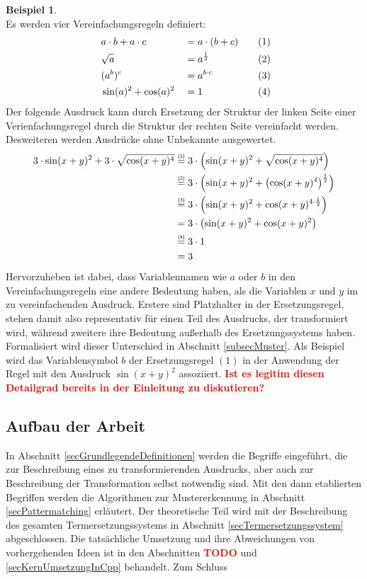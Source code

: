 \documentclass{scrartcl}
\numberwithin{figure}{section} %
\DeclarePairedDelimiter\paren{(}{)}
\theoremstyle{definition} %
\newcommand{\stapel}[2]{\mathrel{\overset{\makebox[0pt]{\mbox{\normalfont\tiny\sffamily {#2}}}}{#1}}}
\newcommand{\BFred}[1]{\textbf{\textcolor{red}{#1}}}
\begin{document}
\newtheorem{bsp}{Beispiel}[section]
\begin{bsp}~\\
Es werden vier Vereinfachungsregeln definiert:
\begin{alignat*}{4}
    ~& a \cdot b + a \cdot c & &= a \cdot (b + c) &~~~& (1) \\
    ~& \sqrt{a}              & &= a^{\frac 1 2}   &~~~& (2) \\
    ~& \paren{a^b}^c         & &= a^{b \cdot c}   &~~~& (3) \\
    ~& \sin(a)^2 + \cos(a)^2 & &= 1               &~~~& (4)
\end{alignat*}
Der folgende Ausdruck kann durch Ersetzung der Struktur der linken Seite einer Verienfachungsregel durch die Struktur der rechten Seite vereinfacht werden. Desweiteren werden Ausdrücke ohne Unbekannte ausgewertet.
\begin{equation*}
    \begin{split}
	3 \cdot \sin(x + y)^2 + 3 \cdot \sqrt{\cos(x + y)^4}
	&\stapel = {(1)} 3 \cdot \paren*{\sin(x + y)^2 + \sqrt{\cos(x + y)^4}} \\
	&\stapel = {(2)} 3 \cdot \paren*{\sin(x + y)^2 + \paren*{{\cos(x + y)^4}}^{\frac 1 2}}\\
	&\stapel = {(3)} 3 \cdot \paren*{\sin(x + y)^2 + {\cos(x + y)^{4 \cdot \frac 1 2}}}\\
	& =              3 \cdot \paren*{\sin(x + y)^2 + {\cos(x + y)^2}}\\
	&\stapel = {(4)} 3 \cdot 1\\
    & = 3
    \end{split}
\end{equation*}
Hervorzuheben ist dabei, dass Variablennamen wie $a$ oder $b$ in den Vereinfachungsregeln eine andere Bedeutung haben, als die Variablen $x$ und $y$ im zu vereinfachenden Ausdruck. Erstere sind Platzhalter in der Ersetzungsregel, stehen damit also representativ für einen Teil des Ausdrucks, der transformiert wird, während zweitere ihre Bedeutung außerhalb des Ersetzungssystems haben. Formalisiert wird dieser Unterschied in Abschnitt \ref{subsecMuster}. Als Beispiel wird das Variablensymbol $b$ der Ersetzungsregel $(1)$ in der Anwendung der Regel mit den Ausdruck $\sin(x + y)^2$ assoziiert. 
\BFred{Ist es legitim diesen Detailgrad bereits in der Einleitung zu diskutieren?}
\end{bsp}

\subsection{Aufbau der Arbeit}
In Abschnitt \ref{secGrundlegendeDefinitionen} werden die Begriffe eingeführt, die zur Beschreibung eines zu transformierenden Ausdrucks, aber auch zur Beschreibung der Transformation selbst notwendig sind. Mit den dann etablierten Begriffen werden die Algorithmen zur Mustererkennung in Abschnitt \ref{secPattermatching} erläutert.  
Der theoretische Teil wird mit der Beschreibung des gesamten Termersetzungssystems in Abschnitt \ref{secTermersetzungssystem} abgeschlossen.
Die tatsächliche Umsetzung und ihre Abweichungen von vorhergehenden Ideen ist in den Abschnitten \BFred{TODO} und \ref{secKernUmsetzungInCpp} behandelt. 
Zum Schluss 
\end{document}
